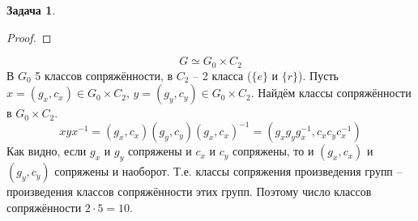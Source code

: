 \documentclass[12pt]{article}
\theoremstyle{definition}
\newtheorem{zad}{Задача}[section]
\begin{document}
\begin{zad}
\begin{itemize}
\begin{proof}
    \end{proof}
    \begin{equation}
        \boxed{G\simeq G_0\times C_2}
    \end{equation}
    В $G_0$ 5 классов сопряжённости, в $C_2$ -- 2 класса ($\{e\}$ и $\{r\}$). Пусть $x=(g_x,c_x)\in G_0\times C_2$, $y=(g_y,c_y)\in G_0\times C_2$. Найдём классы сопряжённости в $G_0\times C_2$.
    \begin{equation}
        xyx^{-1}=(g_x,c_x)(g_y,c_y)(g_x,c_x)^{-1}=(g_xg_yg_x^{-1},c_xc_yc_x^{-1})
    \end{equation}
    Как видно, если $g_x$ и $g_y$ сопряжены и $c_x$ и $c_y$ сопряжены, то и $(g_x,c_x)$ и $(g_y,c_y)$ сопряжены и наоборот. Т.е. классы сопряжения произведения групп -- произведения классов сопряжённости этих групп. Поэтому число классов сопряжённости $2\cdot 5=10$.
\end{itemize}
\end{zad}
\end{document}
